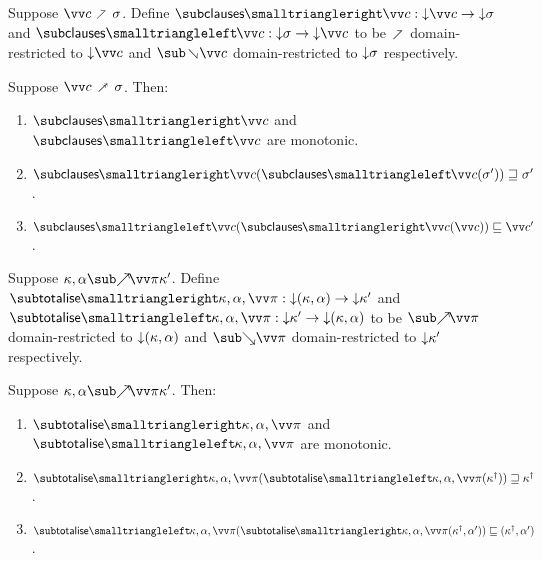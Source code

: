 \begin{definition}
   Suppose $\vec{c} \clauseFwdR \sigma$. Define $\clausesFwdF{\vec{c}}: \Below{\vec{c}} \to \Below{\sigma}$ and $\clausesBwdF{\vec{c}}: \Below{\sigma} \to \Below{\vec{c}}$ to be $\clauseFwdR$ domain-restricted to $\Below{\vec{c}}$ and $\clauseBwdR{\vec{c}}$ domain-restricted to ${\downarrow}{\sigma}$ respectively.
\end{definition}

\begin{lemma}
  \label{lem:aux:clauses:gc}
  Suppose $\vec{c} \clausesFwdR \sigma$. Then:
  \begin{enumerate}
     \item $\clausesFwdF{\vec{c}}$ and $\clausesBwdF{\vec{c}}$ are monotonic.
     \item $\clausesFwdF{\vec{c}}(\clausesBwdF{\vec{c}}(\sigma')) \geq \sigma'$.
     \item $\clausesBwdF{\vec{c}}(\clausesFwdF{\vec{c}}(\vec{c})) \leq \vec{c}'$.
  \end{enumerate}
\end{lemma}

\begin{definition}
   Suppose $\totaliseFwd{\kappa}{\alpha}{\vec{\pi}}{\kappa'}$. Define $\totaliseFwdF{\kappa,\alpha,\vec{\pi}}: \Below{(\kappa,\alpha)} \to \Below{\kappa'}$ and $\totaliseBwdF{\kappa,\alpha,\vec{\pi}}: \Below{\kappa'} \to \Below{(\kappa,\alpha)}$ to be $\totaliseFwdR{\vec{\pi}}$ domain-restricted to ${\downarrow}{(\kappa,\alpha)}$ and $\totaliseBwdR{\vec{\pi}}$ domain-restricted to ${\downarrow}{\kappa'}$ respectively.
\end{definition}

\begin{lemma}
  \label{lem:aux:list-gen:gc}
  \item
  Suppose $\totaliseFwd{\kappa}{\alpha}{\vec{\pi}}{\kappa'}$. Then:
  \begin{enumerate}
     \item $\totaliseFwdF{\kappa,\alpha,\vec{\pi}}$ and $\totaliseBwdF{\kappa,\alpha,\vec{\pi}}$ are monotonic.
     \item $\totaliseFwdF{\kappa,\alpha,\vec{\pi}}(\totaliseBwdF{\kappa,\alpha,\vec{\pi}}(\smash{\kappa^\dagger})) \geq \smash{\kappa^\dagger}$.
     \item $\totaliseBwdF{\kappa,\alpha,\vec{\pi}}(\totaliseFwdF{\kappa,\alpha,\vec{\pi}}(\smash{\kappa^\dagger}, \alpha')) \leq (\smash{\kappa^\dagger}, \alpha')$.
  \end{enumerate}
\end{lemma}
